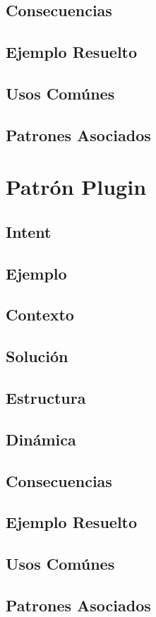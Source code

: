 \subsection*{Consecuencias}

\subsection*{Ejemplo Resuelto}

\subsection*{Usos Comúnes}

\subsection*{Patrones Asociados}

\newpage

\section{Patrón Plugin}
\label{chap4:PluginPatt}
\subsection*{Intent}

\subsection*{Ejemplo}

\subsection*{Contexto}

\subsection*{Solución}

\subsection*{Estructura}

\subsection*{Dinámica}

\subsection*{Consecuencias}

\subsection*{Ejemplo Resuelto}

\subsection*{Usos Comúnes}

\subsection*{Patrones Asociados}

